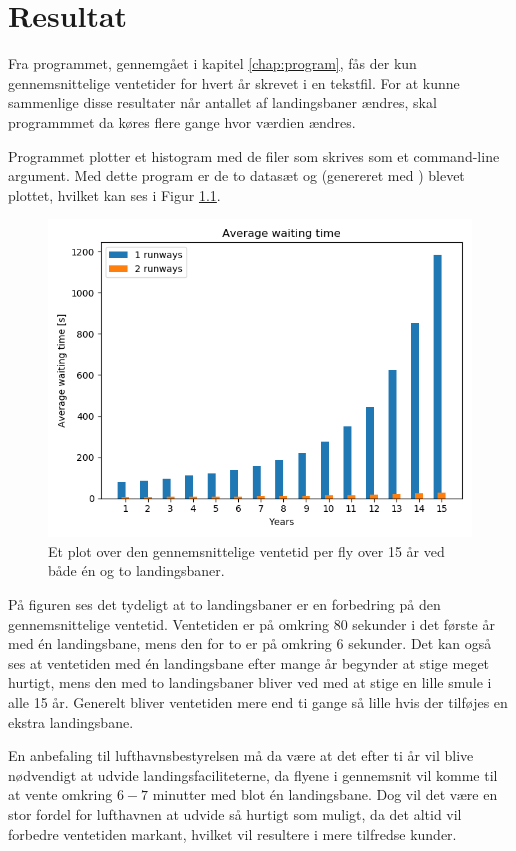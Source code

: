 \chapter{Resultat}
Fra programmet, gennemgået i kapitel \ref{chap:program}, fås der kun gennemsnittelige ventetider for hvert år skrevet i en tekstfil.
For at kunne sammenlige disse resultater når antallet af landingsbaner ændres, skal programmmet da køres flere gange hvor værdien  ændres.

Programmet  plotter et histogram med de filer som skrives som et command-line argument.
Med dette program er de to datasæt  og  (genereret med ) blevet plottet, hvilket kan ses i Figur \ref{fig:results}.

\begin{figure}[h]
	\centering
	\includegraphics[scale=0.7]{fig/img/results_15Y.png}
	\caption{Et plot over den gennemsnittelige ventetid per fly over 15 år ved både én og to landingsbaner.} \label{fig:results}
\end{figure}

På figuren ses det tydeligt at to landingsbaner er en forbedring på den gennemsnittelige ventetid.
Ventetiden er på omkring 80 sekunder i det første år med én landingsbane, mens den for to er på omkring 6 sekunder.
Det kan også ses at ventetiden med én landingsbane efter mange år begynder at stige meget hurtigt, mens den med to landingsbaner bliver ved med at stige en lille smule i alle 15 år.
Generelt bliver ventetiden mere end ti gange så lille hvis der tilføjes en ekstra landingsbane.

En anbefaling til lufthavnsbestyrelsen må da være at det efter ti år vil blive nødvendigt at udvide landingsfaciliteterne, da flyene i gennemsnit vil komme til at vente omkring $6-7$ minutter med blot én landingsbane.
Dog vil det være en stor fordel for lufthavnen at udvide så hurtigt som muligt, da det altid vil forbedre ventetiden markant, hvilket vil resultere i mere tilfredse kunder.
